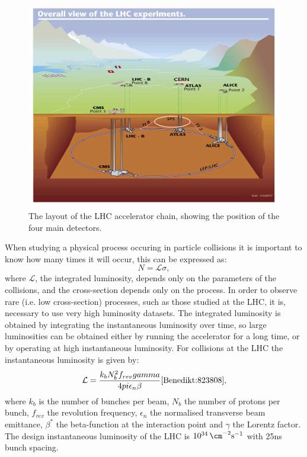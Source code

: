 \begin{figure}
  \includegraphics[width=\largefigwidth]{plots/detector/lhc_layout_sch.jpg}
  \caption{The layout of the LHC accelerator chain, showing the position of the four main detectors.}
  \label{fig:lhclayout}
\end{figure}

When studying a physical process occuring in particle collisions it is important to know how many times it will occur, this can be expressed as:
\begin{equation}
  N = \mathcal{L}\sigma,
\end{equation}
where $\mathcal{L}$, the integrated luminosity, depends only on the parameters of the collisions, and the cross-section depends only on the process. In order to observe rare (i.e. low cross-section) processes, such as those studied at the LHC, it is, necessary to use very high luminosity datasets. The integrated luminosity is obtained by integrating the instantaneous luminosity over time, so large luminosities can be obtained either by running the accelerator for a long time, or by operating at high instantaneous luminosity. For collisions at the LHC the instantaneous luminosity is given by:
\begin{equation}
  \mathcal{L}=\frac{k_{b}N_{b}^{2}f_{rev}\gamma}{4\pi\epsilon_{n}\beta} \cite{Benedikt:823808},
\end{equation}
where $k_{b}$ is the number of bunches per beam, $N_{b}$ the number of protons per bunch, $f_{rev}$ the revolution frequency, $\epsilon_{n}$ the normalised transverse beam emittance, $\beta^{*}$ the beta-function at the interaction point and $\gamma$ the Lorentz factor. The design instantaneous luminosity of the LHC is $10^{34}\,\cm^{-2}\rm{s}^{-1}$ with 25ns bunch spacing.

